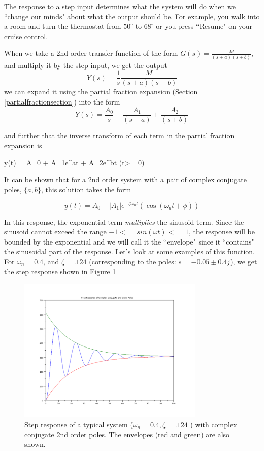 The response to  a step input determines what the system will do when we ``change our minds" about what the output should be.  For example, you walk into a room and turn the thermostat from $50^\circ$ to $68^\circ$ or you press ``Resume" on your cruise control.


When we take a 2nd order transfer function of the form $G(s) = \frac{M}{(s+a)(s+b)}$, and multiply it by the step input, we get the output
\[
Y(s) = \frac{1}{s}\frac{M}{(s+a)(s+b)}
\]
we can expand it using the partial fraction expansion (Section \ref{partialfractionsection}) into the form
\[
Y(s) = \frac{A_0}{s} + \frac{A_1}{(s+a)}+  \frac{A_2}{(s+b)}
\]

and further that the inverse transform of each term in the partial fraction expansion is

\bq\label{dampedexponentialsolution}
y(t) = A_0 +  A_1e^{at} + A_2e^{bt}   \qquad (t>= 0)
\eq

It can be shown that for a 2nd order system with a pair of complex conjugate poles, $\{a,b\}$, this solution takes the form

\[
y(t) = A_0-|A_1|e^{-\zeta\omega_n t} (\cos({\omega_dt +\phi}))
\]

In this response, the exponential term {\it multiplies } the sinusoid term.  Since the sinusoid cannot exceed the range $-1<=sin(\omega t)<=1$, the response will be bounded by the exponential and we will call it the ``envelope" since it ``contains" the sinusoidal part of the response.
Let's look at some examples of this function.  For $\omega_n = 0.4$, and $\zeta=.124$ (corresponding to the poles: $s = -0.05\pm0.4j$), we get the step response shown in Figure \ref{typicalstep}



\begin{figure}\centering
\includegraphics[width=3.5in]{figs05/typical_stepa.png}
\caption{Step response of a typical system ($\omega_n = 0.4, \zeta=.124$ ) with complex conjugate 2nd order poles. The envelopes (red and green) are also shown.}\label{typicalstep}
\end{figure}




